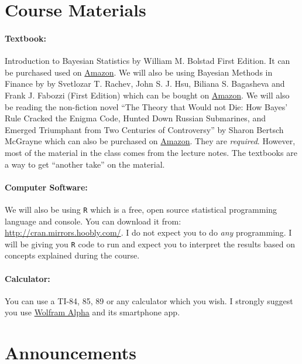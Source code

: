 \documentclass[12pt]{article}
\newcommand{\qu}[1]{``#1''}
\begin{document}
\section*{Course Materials}

\paragraph{Textbook:} Introduction to Bayesian Statistics by William M. Bolstad First Edition. It can be purchased used on \href{http://www.amazon.com/gp/offer-listing/0471270202/ref=sr_1_2_twi_1_har_olp?ie=UTF8&qid=1433515305&sr=8-2&keywords=introduction+to+bayesian+statistics+bolstad}{Amazon}. We will also be using Bayesian Methods in Finance by by Svetlozar T. Rachev, John S. J. Hsu, Biliana S. Bagasheva  and Frank J. Fabozzi (First Edition) which can be bought on \href{http://www.amazon.com/gp/product/0471920835/ref=ox_sc_sfl_title_1?ie=UTF8&psc=1&smid=A1Q1B6W57NND6W}{Amazon}. We will also be reading the non-fiction novel \qu{The Theory that Would not Die: How Bayes' Rule Cracked the Enigma Code, Hunted Down Russian Submarines, and Emerged Triumphant from Two Centuries of Controversy} by Sharon Bertsch McGrayne which can also be purchased on \href{http://www.amazon.com/Theory-That-Would-Not-Die/dp/0300188226/ref=sr_1_1?ie=UTF8&qid=1454261896&sr=8-1&keywords=The+Theory+that+Would+not+Die}{Amazon}. They are \textit{required}. However, most of the material in the class comes from the lecture notes. The textbooks are a way to get ``another take'' on the material.

\paragraph{Computer Software:} We will also be using \texttt{R} which is a free, open source statistical programming language and console. You can download it from: \url{http://cran.mirrors.hoobly.com/}. I do not expect you to do \textit{any} programming. I will be giving you \texttt{R} code to run and expect you to interpret the results based on concepts explained during the course.

\paragraph{Calculator:} You can use a TI-84, 85, 89 or any calculator which you wish. I strongly suggest you use \href{http://www.wolframalpha.com/}{Wolfram Alpha} and its smartphone app.

\section*{Announcements}
\end{document}
